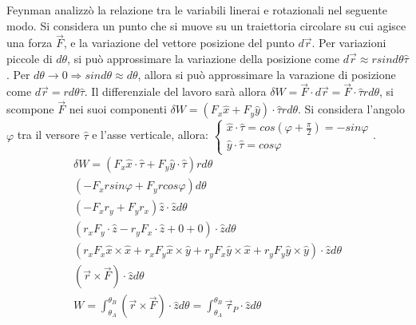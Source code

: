 \documentclass{article}
\numberwithin{equation}{subsection}
\begin{document}
Feynman analizzò la relazione tra le variabili linerai e 
rotazionali nel seguente modo. Si considera un punto che si 
muove su un traiettoria circolare su cui agisce una forza $\vec{F}$, 
e la variazione del vettore posizione del punto $d\vec{r}$. Per 
variazioni piccole di $d\theta$, si può approssimare la variazione 
della posizione come $d\vec{r}\approx rsind\theta\hat{\tau}$. Per 
$d\theta\to 0\Rightarrow sind\theta\approx d\theta$, allora si può 
approssimare la varazione di posizione come $d\vec{r}=rd\theta\hat{\tau}$. 
Il differenziale del lavoro sarà allora $\delta W =\vec{F}\cdot d\vec{r}=\vec{F}\cdot\hat{\tau}rd\theta$, 
si scompone $\vec{F}$ nei suoi componenti $\delta W=(F_x\hat{x}+F_y\hat{y})\cdot\hat{\tau}rd\theta$. 
Si considera l'angolo $\varphi$ tra il versore $\hat{\tau}$ e l'asse 
verticale, allora: 
$\begin{cases}
    \displaystyle\hat{x}\cdot\hat{\tau}=cos\left(\varphi+\displaystyle\frac{\pi}{2}\right)=-sin\varphi\\
    \displaystyle\hat{y}\cdot\hat{\tau}=cos\varphi
\end{cases}$. 
\begin{gather}
    \delta W =(F_x\hat{x}\cdot\hat{\tau}+F_y\hat{y}\cdot\hat{\tau})rd\theta\\
    (-F_xrsin\varphi+F_yrcos\varphi)d\theta\\
    (-F_xr_y+F_yr_x)\hat{z}\cdot\hat{z}d\theta\\
    (r_xF_y\cdot\hat{z}-r_yF_x\cdot\hat{z}+0+0)\cdot\hat{z}d\theta\\
    (r_xF_x\hat{x}\times\hat{x}+r_xF_y\hat{x}\times\hat{y}+r_yF_x\hat{y}\times\hat{x}+r_yF_y\hat{y}\times\hat{y})\cdot\hat{z}d\theta\\
    (\vec{r}\times\vec{F})\cdot\hat{z}d\theta\\
    W=\displaystyle\int_{\theta_A}^{\theta_B}(\vec{r}\times\vec{F})\cdot\hat{z}d\theta=\int_{\theta_A}^{\theta_B}\vec{\tau}_P\cdot\hat{z}d\theta
\end{gather}
\end{document}
